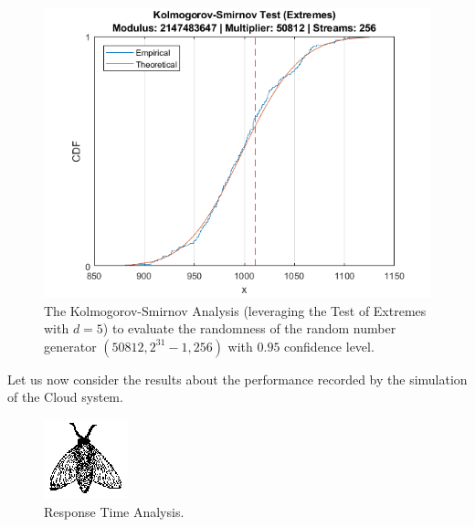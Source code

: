 \begin{figure}
	\label{fig:evaluation-randomness-kolmogorov-smirnov-50812}
	\includegraphics[width=\columnwidth]{fig/evaluation-randomness-kolmogorov-smirnov-50812}
	\caption{The Kolmogorov-Smirnov Analysis (leveraging the Test of Extremes with $d=5$) to evaluate the randomness of the random number generator $(50812,2^{31}-1, 256)$ with $0.95$ confidence level.}
\end{figure}


Let us now consider the results about the performance recorded by the simulation of the Cloud system.

\begin{figure}
  \label{fig:experimental-analysis-response-time}
  \includegraphics{fig/fly}
  \caption{Response Time Analysis.}
\end{figure}
